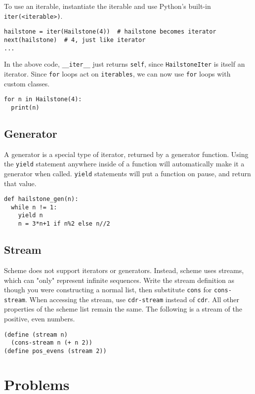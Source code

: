\documentclass[a4paper]{book}
\begin{document}
To use an iterable, instantiate the iterable and use Python's built-in {\tt iter(<iterable>)}.

\begin{lstlisting}
hailstone = iter(Hailstone(4))  # hailstone becomes iterator
next(hailstone)  # 4, just like iterator
...
\end{lstlisting}

In the above code, {\tt \_\_iter\_\_} just returns {\tt self}, since {\tt HailstoneIter} is itself an iterator. Since {\tt for} loops act on {\tt iterables}, we can now use {\tt for} loops with custom classes.

\begin{lstlisting}
for n in Hailstone(4):
  print(n)
\end{lstlisting}

\subsection{Generator}

A generator is a special type of iterator, returned by a generator function. Using the {\tt yield} statement anywhere inside of a function will automatically make it a generator when called. {\tt yield} statements will put a function on pause, and return that value.

\begin{lstlisting}
def hailstone_gen(n):
  while n != 1:
    yield n
    n = 3*n+1 if n%2 else n//2
\end{lstlisting}

\subsection{Stream}

Scheme does not support iterators or generators. Instead, scheme uses streams, which can "only" represent infinite sequences. Write the stream definition as though you were constructing a normal list, then substitute {\tt cons} for {\tt cons-stream}. When accessing the stream, use {\tt cdr-stream} instead of {\tt cdr}. All other properties of the scheme list remain the same. The following is a stream of the positive, even numbers.

\begin{lstlisting}
(define (stream n)
  (cons-stream n (+ n 2))
(define pos_evens (stream 2))
\end{lstlisting}

\section{Problems}
\end{document}
